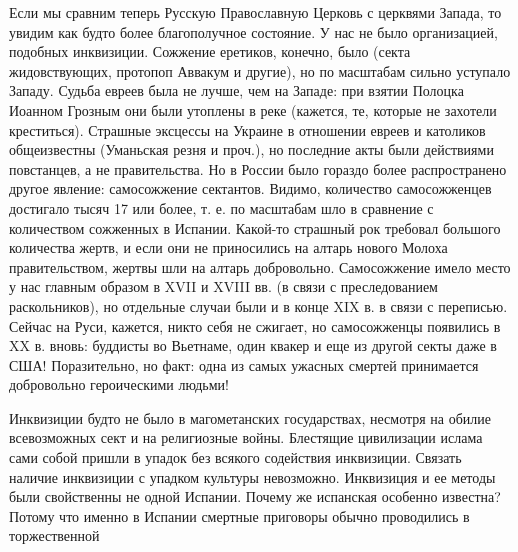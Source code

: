 Если мы сравним теперь Русскую Православную Церковь с церквями Запада, то
увидим как будто более благополучное состояние. У нас не было организацией,
подобных инквизиции. Сожжение еретиков, конечно, было (секта жидовствующих,
протопоп Аввакум и другие), но по масштабам сильно уступало Западу. Судьба
евреев была не лучше, чем на Западе: при взятии Полоцка Иоанном Грозным они
были утоплены в реке (кажется, те, которые не захотели креститься). Страшные
эксцессы на Украине в отношении евреев и католиков общеизвестны (Уманьская
резня и проч.), но последние акты были действиями повстанцев, а не
правительства. Но в России было гораздо более распространено другое явление:
самосожжение сектантов. Видимо, количество самосожженцев достигало тысяч 17 или
более, т. е. по масштабам шло в сравнение с количеством сожженных в Испании.
Какой-то страшный рок требовал большого количества жертв, и если они не
приносились на алтарь нового Молоха правительством, жертвы шли на алтарь
добровольно. Самосожжение имело место у нас главным образом в XVII и XVIII вв.
(в связи с преследованием раскольников), но отдельные случаи были и в конце XIX
в. в связи с переписью. Сейчас на Руси, кажется, никто себя не сжигает, но
самосожженцы появились в XX в. вновь: буддисты во Вьетнаме, один квакер и еще
из другой секты даже в США! Поразительно, но факт: одна из самых ужасных
смертей принимается добровольно героическими людьми!

Инквизиции будто не было в магометанских государствах, несмотря на
обилие всевозможных сект и на религиозные войны. Блестящие цивилизации
ислама сами собой пришли в упадок без всякого содействия инквизиции.
Связать наличие инквизиции с упадком культуры невозможно. Инквизиция и
ее методы были свойственны не одной Испании. Почему же испанская
особенно известна? Потому что именно в Испании смертные приговоры
обычно проводились в торжественной
